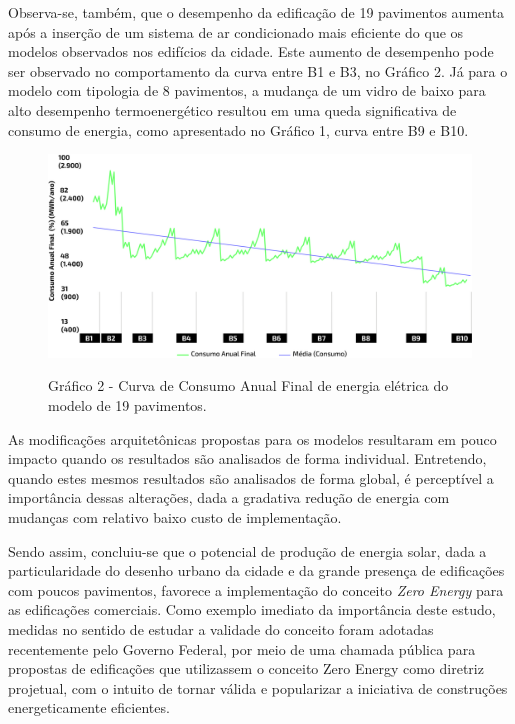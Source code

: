 \begin{onehalfspace}
    \noindent Observa-se, também, que o desempenho da edificação de 19 pavimentos aumenta 
    após a inserção de um sistema de ar condicionado mais eficiente do que os modelos 
    observados nos edifícios da cidade. Este aumento de desempenho pode ser observado no 
    comportamento da curva entre B1 e B3, no Gráfico 2. Já para o modelo com tipologia de 
    8 pavimentos, a mudança de um vidro de baixo para alto desempenho termoenergético resultou 
    em uma queda significativa de consumo de energia, como apresentado no Gráfico 1, curva 
    entre B9 e B10.\vspace*{0.3cm}
    \begin{figure}[H]
        \centering
        \includegraphics[width=1\textwidth]{figures/grafico-19pav.png}
        \begin{flushleft}
            \small Gráfico 2 - Curva de Consumo Anual Final de energia elétrica do modelo de 19 pavimentos.
        \end{flushleft}
    \end{figure}

    \noindent As modificações arquitetônicas propostas para os modelos resultaram em pouco 
    impacto quando os resultados são analisados de forma individual. Entretendo, quando 
    estes mesmos resultados são analisados de forma global, é perceptível a importância 
    dessas alterações, dada a gradativa redução de energia com mudanças com relativo baixo 
    custo de implementação.\vspace*{0.3cm}

    \noindent Sendo assim, concluiu-se que o potencial de produção de energia solar, 
    dada a particularidade do desenho urbano da cidade e da grande presença de edificações 
    com poucos pavimentos, favorece a implementação do conceito \textit{Zero Energy} para 
    as edificações comerciais. Como exemplo imediato da importância deste estudo, medidas 
    no sentido de estudar a validade do conceito foram adotadas recentemente pelo Governo 
    Federal, por meio de uma chamada pública para propostas de edificações que utilizassem 
    o conceito Zero Energy como diretriz projetual, com o intuito de tornar válida e 
    popularizar a iniciativa de construções energeticamente eficientes.
\end{onehalfspace}
